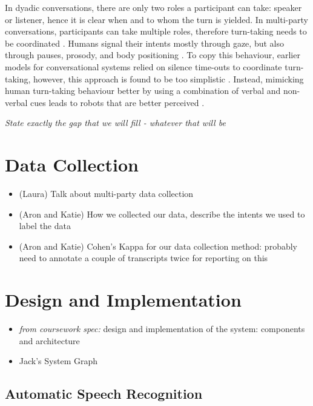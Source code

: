\documentclass[hidelinks, 11pt]{article}
\begin{document}
In dyadic conversations, there are only two roles a participant can take: speaker or listener, hence it is clear when and to whom the turn is yielded. In multi-party conversations, participants can take multiple roles, therefore turn-taking needs to be coordinated \cite{Johansson_Skantze_2015}. Humans signal their intents mostly through gaze, but also through pauses, prosody, and body positioning \cite{Żarkowski_2019}. To copy this behaviour, earlier models for conversational systems relied on silence time-outs to coordinate turn-taking, however, this approach is found to be too simplistic \cite{skantze_turn_taking_2021}. Instead, mimicking human turn-taking behaviour better by using a combination of verbal and non-verbal cues leads to robots that are better perceived \cite{moujahid_multi_party_2022}.

\textit{State exactly the gap that we will fill - whatever that will be}


\section{Data Collection}
\label{sec:data_collection}

\begin{itemize}
  \item (Laura) Talk about multi-party data collection
  \item (Aron and Katie) How we collected our data, describe the intents we used to label the data
  \item (Aron and Katie) Cohen's Kappa for our data collection method: probably need to annotate a couple of transcripts twice for reporting on this
\end{itemize}

\section{Design and Implementation}
\label{sec:implementation}

\begin{itemize}
  \item \textit{from coursework spec:} design and implementation of the system: components and architecture
  \item Jack's System Graph
\end{itemize}

\subsection{Automatic Speech Recognition}
\label{subsec:asr}
\end{document}
